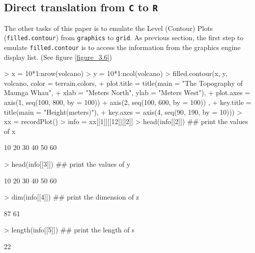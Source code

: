 \documentclass[paper=a4, fontsize=11pt]{report}
\begin{document}
\subsection{Direct translation from \texttt{C} to \texttt{R}}
The other tasks of this paper is to emulate the Level (Contour) Plots (\texttt{filled.contour}) from \texttt{graphics} to \texttt{grid}. As previous section, the first step to emulate \texttt{filled.contour} is to access the information from the graphics engine display list. (See figure \ref{figure_3.6})
\begin{Schunk}
\begin{Sinput}
> x = 10*1:nrow(volcano)
> y = 10*1:ncol(volcano)
> filled.contour(x, y, volcano, color = terrain.colors,
+     plot.title = title(main = "The Topography of Maunga Whau",
+     xlab = "Meters North", ylab = "Meters West"),
+     plot.axes = { axis(1, seq(100, 800, by = 100))
+                   axis(2, seq(100, 600, by = 100)) },
+     key.title = title(main = "Height\n(meters)"),
+     key.axes = axis(4, seq(90, 190, by = 10)))
> xx = recordPlot()
> info = xx[[1]][[12]][[2]]
> head(info[[2]])  ## print the values of x
\end{Sinput}
\begin{Soutput}
[1] 10 20 30 40 50 60
\end{Soutput}
\begin{Sinput}
> head(info[[3]])  ## print the values of y
\end{Sinput}
\begin{Soutput}
[1] 10 20 30 40 50 60
\end{Soutput}
\begin{Sinput}
> dim(info[[4]])  ## print the dimension of z
\end{Sinput}
\begin{Soutput}
[1] 87 61
\end{Soutput}
\begin{Sinput}
> length(info[[5]])  ## print the length of s
\end{Sinput}
\begin{Soutput}
[1] 22
\end{Soutput}
\end{Schunk}
\end{document}
